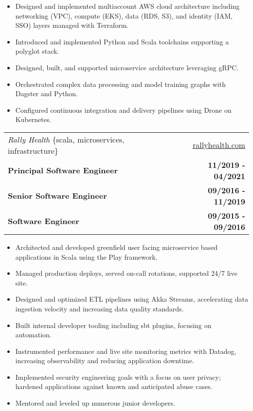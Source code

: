 \documentclass[10pt,letterpaper]{article}
\begin{document}
\begin{itemize}
  \item Designed and implemented multiaccount AWS cloud architecture including networking (VPC), \linebreak compute (EKS), data (RDS, S3), and identity (IAM, SSO) layers managed with Terraform.
\item Introduced and implemented Python and Scala toolchains supporting a polyglot stack.
\item Designed, built, and supported microservice architecture leveraging gRPC.
\item Orchestrated complex data processing and model training graphs with Dagster and Python.
\item Configured continuous integration and delivery pipelines using Drone on Kubernetes.
\end{itemize}

\vspace{0.25cm}


\noindent\begin{tabularx}{\textwidth}{@{} Xr @{}}
  \textit{Rally Health} \{scala, microservices, infrastructure\} & \href{https://www.rallyhealth.com}{rallyhealth.com} \\
  \textbf{Principal Software Engineer} & \textbf{11/2019 - 04/2021} \\
  \textbf{Senior Software Engineer} & \textbf{09/2016 - 11/2019} \\
  \textbf{Software Engineer} & \textbf{09/2015 - 09/2016} \\
\end{tabularx}

\begin{itemize}
\item Architected and developed greenfield user facing microservice based applications in \linebreak Scala using the Play framework.
\item Managed production deploys, served on-call rotations, supported 24/7 live site.
\item Designed and optimized ETL pipelines using Akka Streams, accelerating data ingestion \linebreak velocity and increasing data quality standards.
\item Built internal developer tooling including sbt plugins, focusing on automation.
\item Instrumented performance and live site monitoring metrics with Datadog, increasing \linebreak observability and reducing application downtime.
\item Implemented security engineering goals with a focus on user privacy; hardened \linebreak applications against known and anticipated abuse cases.
\item Mentored and leveled up numerous junior developers.
\end{itemize}
\end{document}
